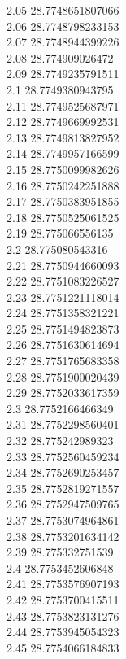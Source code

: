 {2.05	28.7748651807066\\
2.06	28.7748798233153\\
2.07	28.7748944399226\\
2.08	28.774909026472\\
2.09	28.7749235791511\\
2.1	28.7749380943795\\
2.11	28.7749525687971\\
2.12	28.7749669992531\\
2.13	28.7749813827952\\
2.14	28.7749957166599\\
2.15	28.7750099982626\\
2.16	28.7750242251888\\
2.17	28.7750383951855\\
2.18	28.7750525061525\\
2.19	28.775066556135\\
2.2	28.775080543316\\
2.21	28.7750944660093\\
2.22	28.7751083226527\\
2.23	28.7751221118014\\
2.24	28.7751358321221\\
2.25	28.7751494823873\\
2.26	28.7751630614694\\
2.27	28.7751765683358\\
2.28	28.7751900020439\\
2.29	28.7752033617359\\
2.3	28.7752166466349\\
2.31	28.7752298560401\\
2.32	28.775242989323\\
2.33	28.7752560459234\\
2.34	28.7752690253457\\
2.35	28.7752819271557\\
2.36	28.7752947509765\\
2.37	28.7753074964861\\
2.38	28.7753201634142\\
2.39	28.775332751539\\
2.4	28.7753452606848\\
2.41	28.7753576907193\\
2.42	28.7753700415511\\
2.43	28.7753823131276\\
2.44	28.7753945054323\\
2.45	28.7754066184833\\
}
